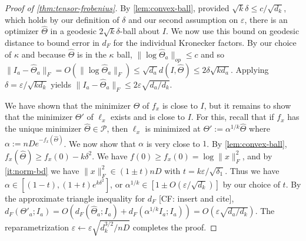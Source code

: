 \documentclass{article}
\newcommand\eps{\varepsilon}
\newcommand\SPD{\mathcal{P}}
\newcommand\samp{x}
\newcommand{\CF}[1]{{\color{purple}[CF: #1]}}
\begin{document}
\begin{proof}[Proof of \cref{thm:tensor-frobenius}]

By \cref{lem:convex-ball}, provided $\sqrt{k} \delta \leq c/\sqrt{d_k}$, which holds by our definition of $\delta$ and our second assumption on $\eps$, there is an optimizer $\widehat{\Theta}$ in a geodesic $2 \sqrt{k} \delta$-ball about $I$. We now use this bound on geodesic distance to bound error in $d_F$ for the individual Kronecker factors. By our choice of $\kappa$ and because $\widehat{\Theta}$ is in the $\kappa$ ball, $\|\log \widehat{\Theta}_a\|_{op} \leq c$ and so $\|I_a - \widehat{\Theta}_a\|_F = O( \| \log \widehat{\Theta}_a\|_F) \leq \sqrt{d_a} d(I, \widehat{\Theta}) \leq 2\delta \sqrt{ k d_a}.$ Applying $\delta = \eps /\sqrt{k d_k}$ yields $\| I_a - \widehat{\Theta}_a\|_F \leq 2\eps \sqrt{ d_a/d_k}$.

We have shown that the minimizer $\widehat{\Theta}$ of $f_\samp$ is close to $I$, but it remains to show that the minimizer $\Theta'$ of $\ell_\samp$ exists and is close to $I$. For this, recall that if $f_\samp$ has the unique minimizer $\widehat{\Theta} \in \SPD$, then $\ell_\samp$ is minimized at $\Theta':= \alpha^{1/k}  \widehat{\Theta}$ where $\alpha:= n D e^{ - f_\samp(\widehat{\Theta})}$. We now show that $\alpha$ is very close to $1$. By \cref{lem:convex-ball}, $f_\samp(\widehat{\Theta}) \geq f_\samp(0) - k\delta^2$. We have $f(0) \geq f_\samp(0) = \log\| \samp\|^2_F$, and by \cref{it:norm-bd} we have $\| \samp\|_F^2 \in (1 \pm t) nD$ with $t = k \eps/\sqrt{\delta_1}$. Thus we have $\alpha \in [(1-t),  (1+t) e^{k \delta^2}]$, or $\alpha^{1/k} \in [1 \pm  O(\eps/\sqrt{d_k})]$ by our choice of $t$. By the approximate triangle inequality for $d_F$ \CF{insert and cite}, $d_F( \Theta'_a; I_a) = O(d_F(\widehat{\Theta}_a; I_a) + d_F(\alpha^{1/k} I_a; I_a)) = O(\eps \sqrt{d_a/d_k})$. The reparametrization $\eps \leftarrow \eps \sqrt{d_k^{3/2}/ n D}$ completes the proof.
\end{proof}



\end{document}
